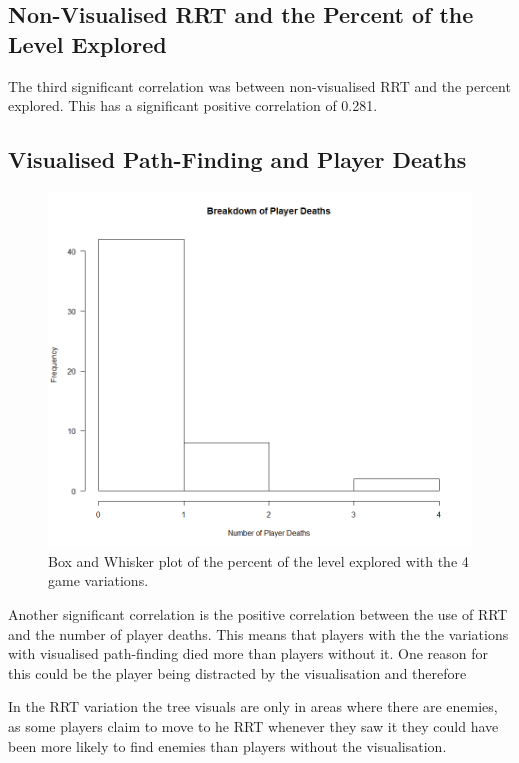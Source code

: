 \documentclass[journal]{IEEEtran}
\begin{document}
	
	\subsection{Non-Visualised RRT and the Percent of the Level Explored}
	
	The third significant correlation was between non-visualised RRT and the percent explored. This has a significant positive correlation of 0.281. 
	
	
	\subsection{Visualised Path-Finding and Player Deaths}
	
	\begin{figure}[h]
		\includegraphics[width=1.0\linewidth]{DeathsHisto.png}
		\caption{Box and Whisker plot of the percent of the level explored with the 4 game variations.}
		\label{graph:DeathsHisto}
	\end{figure}
	Another significant correlation  is the positive correlation between the use of RRT and the number of player deaths. This means that players with the the variations with visualised path-finding died more than players without it. One reason for this could be the player being distracted by the visualisation and therefore 
	
	In the RRT variation the tree visuals are only in areas where there are enemies, as some players claim to move to he RRT whenever they saw it they could have been more likely to find enemies than players without the visualisation.
	
\end{document}
